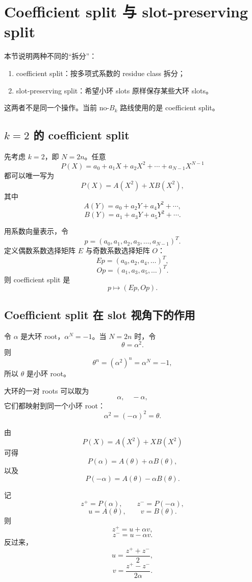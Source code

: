 \documentclass[UTF8,11pt]{ctexart}
\theoremstyle{definition}
\begin{document}
\section{Coefficient split 与 slot-preserving split}

本节说明两种不同的“拆分”：

\begin{enumerate}[label=(\arabic*)]
    \item coefficient split：按多项式系数的 residue class 拆分；
    \item slot-preserving split：希望小环 slots 原样保存某些大环 slots。
\end{enumerate}

这两者不是同一个操作。当前 no-\(B_k\) 路线使用的是 coefficient split。

\subsection{\(k=2\) 的 coefficient split}

先考虑 \(k=2\)，即 \(N=2n\)。任意
\[
P(X)=a_0+a_1X+a_2X^2+\cdots+a_{N-1}X^{N-1}
\]
都可以唯一写为
\[
P(X)=A(X^2)+XB(X^2),
\]
其中
\[
A(Y)=a_0+a_2Y+a_4Y^2+\cdots,
\]
\[
B(Y)=a_1+a_3Y+a_5Y^2+\cdots.
\]

用系数向量表示，令
\[
p=(a_0,a_1,a_2,a_3,\ldots,a_{N-1})^T.
\]
定义偶数系数选择矩阵 \(E\) 与奇数系数选择矩阵 \(O\)：
\[
Ep=(a_0,a_2,a_4,\ldots)^T,
\]
\[
Op=(a_1,a_3,a_5,\ldots)^T.
\]
则 coefficient split 是
\[
p\longmapsto (Ep,Op).
\]

\subsection{Coefficient split 在 slot 视角下的作用}

令 \(\alpha\) 是大环 root，\(\alpha^N=-1\)。当 \(N=2n\) 时，令
\[
\theta=\alpha^2.
\]
则
\[
\theta^n=(\alpha^2)^n=\alpha^N=-1,
\]
所以 \(\theta\) 是小环 root。

大环的一对 roots 可以取为
\[
\alpha,\quad -\alpha,
\]
它们都映射到同一个小环 root：
\[
\alpha^2=(-\alpha)^2=\theta.
\]

由
\[
P(X)=A(X^2)+XB(X^2)
\]
可得
\[
P(\alpha)=A(\theta)+\alpha B(\theta),
\]
以及
\[
P(-\alpha)=A(\theta)-\alpha B(\theta).
\]

记
\[
z^+=P(\alpha),\qquad z^-=P(-\alpha),
\]
\[
u=A(\theta),\qquad v=B(\theta).
\]
则
\[
z^+=u+\alpha v,
\]
\[
z^-=u-\alpha v.
\]
反过来，
\[
u=\frac{z^++z^-}{2},
\]
\[
v=\frac{z^+-z^-}{2\alpha}.
\]
\end{document}
